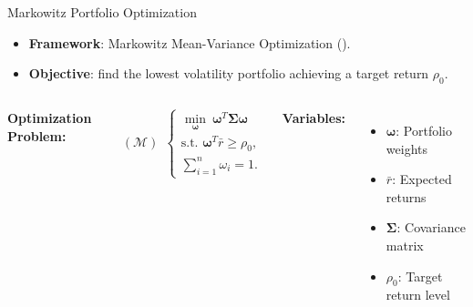 \documentclass[dvipsnames,mathserif]{beamer}
\begin{document}
\begin{frame}{Markowitz Portfolio Optimization}
\vfill
\begin{itemize}
    \item \textbf{Framework}: Markowitz Mean-Variance Optimization (\cite{MarkowitzPO}).
    \item \textbf{Objective}: find the lowest volatility portfolio achieving a target return $\rho_0$.
\end{itemize}


\bigskip 
    \begin{columns}

        \textbf{Optimization Problem:}
        
        \begin{equation*}
            (\boldsymbol{\mathcal{M}}) ~~
            \left\{
                \begin{array}{ll}
                    \underset{\boldsymbol{\omega}}{\min} ~ \boldsymbol{\omega}^T\boldsymbol{\Sigma}\boldsymbol{\omega} \\
                    \text{s.t. } \boldsymbol{\omega}^T \bar{r} \geq \rho_0, \\
                    \sum_{i=1}^n \omega_i = 1.
                \end{array}
            \right.
        \end{equation*}

        
        \textbf{Variables:}

        \bigskip
        \centering
        \begin{itemize}
            \item \( \boldsymbol{\omega} \): Portfolio weights
            \item \( \bar{r} \): Expected returns
            \item \( \boldsymbol{\Sigma} \): Covariance matrix
            \item \( \rho_0 \): Target return level
        \end{itemize}

    \end{columns}
\vfill
\end{frame}
\end{document}
